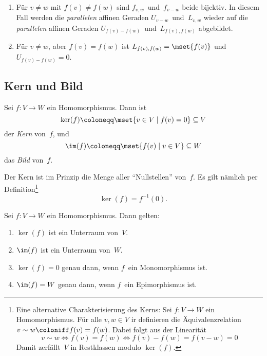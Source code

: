 \documentclass[a4paper]{article}
\begin{document}
\begin{remark}\leavevmode
    \begin{enumerate}
        \item Für $v \neq w$ mit $f(v) \neq f(w)$ sind $f_{v,w}$~und~$f_{v-w}$ beide bijektiv. In diesem Fall werden die \emph{parallelen} affinen Geraden $U_{v-w}$~und~$L_{v,w}$ wieder auf die \emph{parallelen} affinen Geraden $U_{f(v)-f(w)}$~und~$L_{f(v),f(w)}$ abgebildet.
        \item Für $v \neq w$, aber $f(v) = f(w)$ ist $L_{f(v),f(w)} = \mset{f(v)}$ und $U_{f(v)-f(w)} = 0$.
    \end{enumerate}
\end{remark}

\subsection{Kern und Bild}

\begin{definition}
    Sei $f\colon V \to W$ ein Homomorphismus. Dann ist
    \begin{equation*}
        \ker(f) \coloneqq \mset{v \in V \mid f(v) = 0} \subseteq V
    \end{equation*}
    der \emph{Kern} von~$f$, und
    \begin{equation*}
        \im(f) \coloneqq \mset{f(v) \mid v \in V} \subseteq W
    \end{equation*}
    das \emph{Bild} von~$f$.
\end{definition}

Der Kern ist im Prinzip die Menge aller "`Nullstellen"' von~$f$. Es gilt nämlich per Definition\footnote{Eine alternative Charakterisierung des Kerns: Sei $f\colon V \to W$ ein Homomorphismus. Für alle $v,w \in V$ ir definieren die Äquivalenzrelation $v \sim w \coloniff f(v) = f(w)$. Dabei folgt aus der Linearität
\begin{equation*}
    v \sim w \iff f(v) = f(w) \iff f(v)-f(w) = f(v-w) = 0
\end{equation*}
Damit zerfällt~$V$ in Restklassen modulo $\ker(f)$.}
\begin{equation*}
    \ker(f) = f^{-1}(0).
\end{equation*}

\begin{lemma}\label{lem:kerim:properties}
    Sei $f\colon V \to W$ ein Homomorphismus. Dann gelten:
    \begin{enumerate}
        \item $\ker(f)$ ist ein Unterraum von~$V$.
        \item $\im(f)$ ist ein Unterraum von~$W$.
        \item $\ker(f) = 0$ genau dann, wenn $f$~ein Monomorphismus ist.
        \item $\im(f) = W$ genau dann, wenn $f$~ein Epimorphismus ist.
    \end{enumerate}
\end{lemma}
\end{document}
